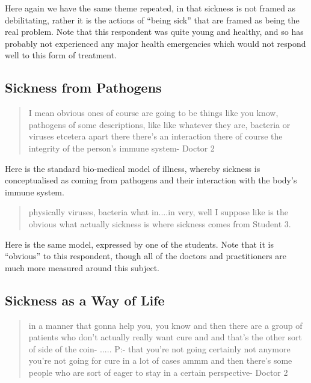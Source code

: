 Here again we have the same theme repeated, in that sickness is not framed as debilitating, rather it is the actions of ``being sick'' that are framed as being the real problem. Note that this respondent was quite young and healthy, and so has probably not experienced any major health emergencies which would not respond well to this form of treatment. 

\subsection{Sickness from Pathogens}
\label{sec:sickn-from-path}

\begin{quotation}
  I mean obvious ones of course are going to be things like you know, pathogens of some descriptions, like like whatever they are, bacteria or viruses etcetera apart there there's an interaction there of course the integrity of the person's immune system-
Doctor 2
\end{quotation}

Here is the standard bio-medical model of illness, whereby sickness is conceptualised as coming from pathogens and their interaction with the body's immune system. 

\begin{quotation}
  physically viruses, bacteria what in....in very, well I suppose like is the obvious what actually sickness is where sickness comes from
Student 3.
\end{quotation}

Here is the same model, expressed by one of the students. Note that it is ``obvious'' to this respondent, though all of the doctors and practitioners are much more measured around this subject. 


\subsection{Sickness as a Way of Life}
\label{sec:sickness-as-way}

\begin{quotation}
   in a manner that gonna help you, you know and then there are a group of patients who don't actually really want cure and and that's the other sort of side of the coin-
.....
P:- that you're not going certainly not anymore you're not going for cure in a lot of cases ammm and then there's some people who are sort of eager to stay in a certain perspective-
Doctor 2
\end{quotation}


